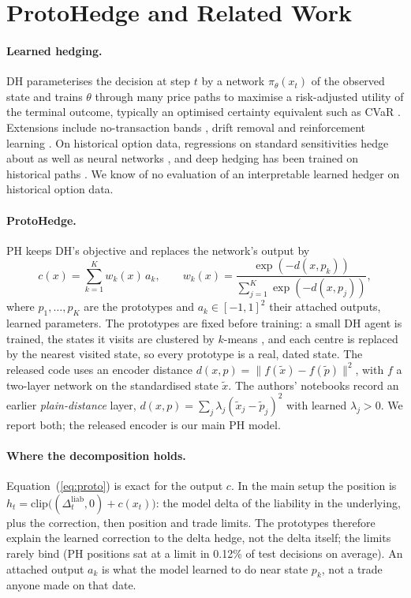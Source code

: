 \documentclass[runningheads]{llncs}
\begin{document}
\section{ProtoHedge and Related Work}

\paragraph{Learned hedging.} DH parameterises the decision at step $t$ by a network $\pi_\theta(x_t)$ of
the observed state and trains $\theta$ through many price paths to maximise a risk-adjusted utility of
the terminal outcome, typically an optimised certainty equivalent such as CVaR
\cite{rockafellar2000,bental2007oce}. Extensions include no-transaction bands \cite{imaki2021notransaction}, drift
removal \cite{buehler2021drift} and reinforcement learning \cite{halperin2020qlbs,kolm2019dynamic,cao2021deep}.
On historical option data, regressions on standard
sensitivities hedge about as well as neural networks \cite{ruf2022hedging}, and deep hedging has been
trained on historical paths \cite{mikkila2023empirical}. We know
of no evaluation of an interpretable learned hedger on historical option data.

\paragraph{ProtoHedge.} PH keeps DH's objective and replaces the network's output by
\begin{equation}
c(x)=\sum_{k=1}^{K} w_k(x)\,a_k,\qquad w_k(x)=\frac{\exp(-d(x,p_k))}{\sum_{j=1}^{K}\exp(-d(x,p_j))},
\label{eq:proto}
\end{equation}
where $p_1,\dots,p_K$ are the prototypes and $a_k\in[-1,1]^2$ their attached outputs, learned parameters.
The prototypes are fixed before training: a small DH agent is trained, the states it visits are clustered
by $k$-means \cite{macqueen1967}, and each centre is replaced by the nearest visited state, so every
prototype is a real, dated state. The released code uses an encoder distance
$d(x,p)=\lVert f(\tilde x)-f(\tilde p)\rVert^2$, with $f$ a two-layer network on the standardised state
$\tilde x$. The authors' notebooks record an earlier \emph{plain-distance} layer,
$d(x,p)=\sum_j\lambda_j(\tilde x_j-\tilde p_j)^2$ with learned $\lambda_j>0$. We report both; the
released encoder is our main PH model.

\paragraph{Where the decomposition holds.} Equation~(\ref{eq:proto}) is exact for the output $c$. In the
main setup the position is $h_t=\mathrm{clip}\big((\Delta^{\mathrm{liab}}_t,0)+c(x_t)\big)$: the model
delta of the liability in the underlying, plus the correction, then position and trade limits. The
prototypes therefore explain the learned correction to the delta hedge, not the delta itself; the limits
rarely bind (PH positions sat at a limit in 0.12\% of test decisions on average). An attached output $a_k$ is
what the model learned to do near state $p_k$, not a trade anyone made on that date.
\end{document}
